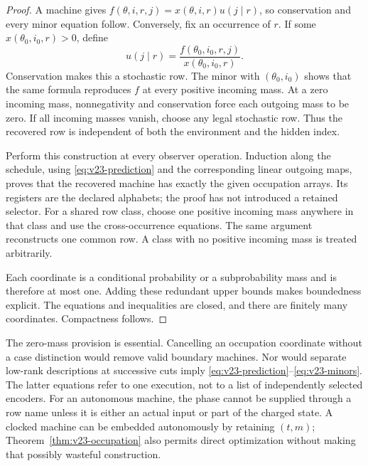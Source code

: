 \begin{proof}
A machine gives
$f(\theta,i,r,j)=x(\theta,i,r)u(j\mid r)$, so conservation and every
minor equation follow. Conversely, fix an occurrence of $r$. If some
$x(\theta_0,i_0,r)>0$, define
\[
 u(j\mid r)=\frac{f(\theta_0,i_0,r,j)}{x(\theta_0,i_0,r)}.
\]
Conservation makes this a stochastic row. The minor with
$(\theta_0,i_0)$ shows that the same formula reproduces $f$ at every
positive incoming mass. At a zero incoming mass, nonnegativity and
conservation force each outgoing mass to be zero. If all incoming
masses vanish, choose any legal stochastic row. Thus the recovered row
is independent of both the environment and the hidden index.

Perform this construction at every observer operation. Induction along
the schedule, using \eqref{eq:v23-prediction} and the corresponding
linear outgoing maps, proves that the recovered machine has exactly
the given occupation arrays. Its registers are the declared alphabets;
the proof has not introduced a retained selector. For a shared row class,
choose one positive incoming mass anywhere in that class and use the
cross-occurrence equations. The same argument reconstructs one common
row. A class with no positive incoming mass is treated arbitrarily.

Each coordinate is a conditional probability or a subprobability mass
and is therefore at most one. Adding these redundant upper bounds makes
boundedness explicit. The equations and inequalities are closed, and
there are finitely many coordinates. Compactness follows.
\end{proof}

The zero-mass provision is essential. Cancelling an occupation coordinate
without a case distinction would remove valid boundary machines. Nor
would separate low-rank descriptions at successive cuts imply
\eqref{eq:v23-prediction}--\eqref{eq:v23-minors}. The latter equations
refer to one execution, not to a list of independently selected encoders.
For an autonomous machine, the phase cannot be supplied through a
row name unless it is either an actual input or part of the charged
state. A clocked machine can be embedded autonomously by retaining
$(t,m)$; Theorem~\ref{thm:v23-occupation} also permits direct optimization
without making that possibly wasteful construction.

